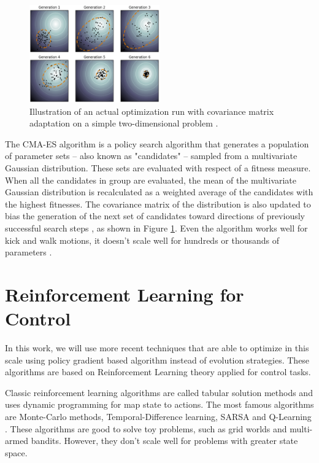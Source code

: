 \begin{figure}[ht!]
	\centering
	\includegraphics[width=0.5\textwidth]{Cap2/CMAES.eps}
	\caption{Illustration of an actual optimization run with covariance matrix adaptation on a simple two-dimensional problem
		\cite{cmaesfig}.}
	\label{cmaesfigure}
\end{figure}

The CMA-ES algorithm is a policy search algorithm that generates a population of parameter sets -- also known as "candidates" -- sampled from a multivariate Gaussian distribution. These sets are evaluated with respect of a fitness measure. When all the candidates in group are evaluated, the mean of the multivariate Gaussian
distribution is recalculated as a weighted average of the
candidates with the highest fitnesses. The covariance matrix
of the distribution is also updated to bias the generation
of the next set of candidates toward directions of previously
successful search steps \cite{AAMAS11-urieli}, as shown in Figure \ref{cmaesfigure}. Even the algorithm works well for kick and walk motions, it doesn't scale well for hundreds or thousands of parameters \cite{mcalpine2017}.


\section{Reinforcement Learning for Control}

In this work, we will use more recent techniques that are able to optimize in this scale using policy gradient based algorithm instead of evolution strategies. These algorithms are based on Reinforcement Learning theory applied for control tasks.

Classic reinforcement learning algorithms are called tabular solution methods and uses dynamic programming for map state to actions. The most famous algorithms are Monte-Carlo methods, Temporal-Difference learning, SARSA \cite{Rummery94on-lineq-learning} and Q-Learning \cite{Watkins:1989}. These algorithms are good to solve toy problems, such as grid worlds and multi-armed bandits. However, they don't scale well for problems with greater state space.

